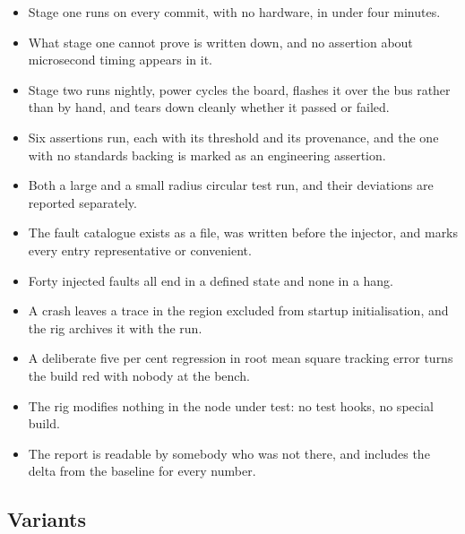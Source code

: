 \begin{itemize}
\item Stage one runs on every commit, with no hardware, in under four minutes.
\item What stage one cannot prove is written down, and no assertion about
microsecond timing appears in it.
\item Stage two runs nightly, power cycles the board, flashes it over the bus
rather than by hand, and tears down cleanly whether it passed or failed.
\item Six assertions run, each with its threshold and its provenance, and the one
with no standards backing is marked as an engineering assertion.
\item Both a large and a small radius circular test run, and their deviations are
reported separately.
\item The fault catalogue exists as a file, was written before the injector, and
marks every entry representative or convenient.
\item Forty injected faults all end in a defined state and none in a hang.
\item A crash leaves a trace in the region excluded from startup initialisation,
and the rig archives it with the run.
\item A deliberate five per cent regression in root mean square tracking error
turns the build red with nobody at the bench.
\item The rig modifies nothing in the node under test: no test hooks, no special
build.
\item The report is readable by somebody who was not there, and includes the
delta from the baseline for every number.
\end{itemize}

\subsection*{Variants}

